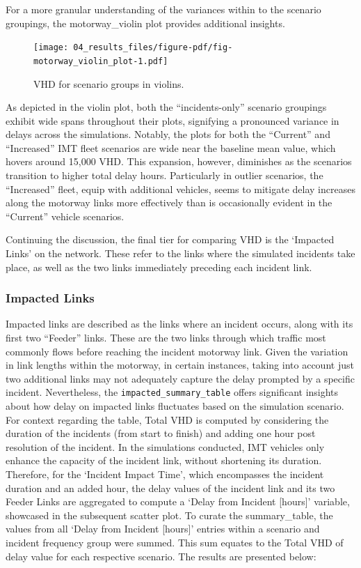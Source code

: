 \documentclass[
  letterpaper,
  authoryear]{elsarticle}
\begin{document}
For a more granular understanding of the variances within to the
scenario groupings, the motorway\_violin plot provides additional
insights.

\begin{figure}

{\centering \texttt{[image: 04\_results\_files/figure-pdf/fig-motorway\_violin\_plot-1.pdf]}

}

\caption{\label{fig-motorway_violin_plot}VHD for scenario groups in
violins.}

\end{figure}

As depicted in the violin plot, both the ``incidents-only'' scenario
groupings exhibit wide spans throughout their plots, signifying a
pronounced variance in delays across the simulations. Notably, the plots
for both the ``Current'' and ``Increased'' IMT fleet scenarios are wide
near the baseline mean value, which hovers around 15,000 VHD. This
expansion, however, diminishes as the scenarios transition to higher
total delay hours. Particularly in outlier scenarios, the ``Increased''
fleet, equip with additional vehicles, seems to mitigate delay increases
along the motorway links more effectively than is occasionally evident
in the ``Current'' vehicle scenarios.

Continuing the discussion, the final tier for comparing VHD is the
`Impacted Links' on the network. These refer to the links where the
simulated incidents take place, as well as the two links immediately
preceding each incident link.

\hypertarget{impacted-links}{%
\subsubsection{Impacted Links}\label{impacted-links}}

Impacted links are described as the links where an incident occurs,
along with its first two ``Feeder'' links. These are the two links
through which traffic most commonly flows before reaching the incident
motorway link. Given the variation in link lengths within the motorway,
in certain instances, taking into account just two additional links may
not adequately capture the delay prompted by a specific incident.
Nevertheless, the \texttt{impacted\_summary\_table} offers significant
insights about how delay on impacted links fluctuates based on the
simulation scenario. For context regarding the table, Total VHD is
computed by considering the duration of the incidents (from start to
finish) and adding one hour post resolution of the incident. In the
simulations conducted, IMT vehicles only enhance the capacity of the
incident link, without shortening its duration. Therefore, for the
`Incident Impact Time', which encompasses the incident duration and an
added hour, the delay values of the incident link and its two Feeder
Links are aggregated to compute a `Delay from Incident {[}hours{]}'
variable, showcased in the subsequent scatter plot. To curate the
summary\_table, the values from all `Delay from Incident {[}hours{]}'
entries within a scenario and incident frequency group were summed. This
sum equates to the Total VHD of delay value for each respective
scenario. The results are presented below:
\end{document}

